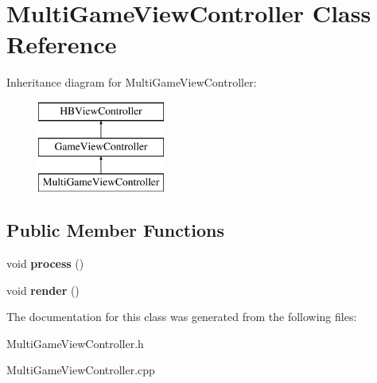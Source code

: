 \hypertarget{class_multi_game_view_controller}{\section{Multi\-Game\-View\-Controller Class Reference}
\label{class_multi_game_view_controller}
}
Inheritance diagram for Multi\-Game\-View\-Controller\-:\begin{figure}[H]
\begin{center}
\leavevmode
\includegraphics[height=3.000000cm]{class_multi_game_view_controller}
\end{center}
\end{figure}
\subsection*{Public Member Functions}
\begin{DoxyCompactItemize}
\item 
\hypertarget{class_multi_game_view_controller_a3c8f554d074bd4182181d093ce1fe1d6}{void {\bfseries process} ()}\label{class_multi_game_view_controller_a3c8f554d074bd4182181d093ce1fe1d6}

\item 
\hypertarget{class_multi_game_view_controller_ac2a0388681043469fba5ec4722e5d7ef}{void {\bfseries render} ()}\label{class_multi_game_view_controller_ac2a0388681043469fba5ec4722e5d7ef}

\end{DoxyCompactItemize}


The documentation for this class was generated from the following files\-:\begin{DoxyCompactItemize}
\item 
Multi\-Game\-View\-Controller.\-h\item 
Multi\-Game\-View\-Controller.\-cpp\end{DoxyCompactItemize}
